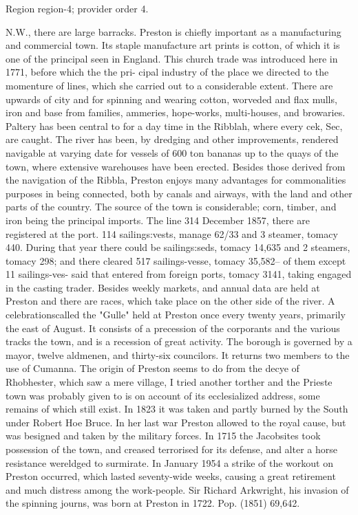\documentclass[11pt]{article}
\begin{document}
{\scriptsize\color{gray} Region region-4; provider order 4.\par}
\medskip

N.W., there are large barracks. Preston is chiefly important as a manufacturing and commercial town. Its staple manufacture art prints is cotton, of which it is one of the principal seen in England. This church trade was introduced here in 1771, before which the the pri-
cipal industry of the place we directed to the momenture of lines, which she carried out to a considerable extent. There are upwards of city and for spinning and wearing cotton, worveded and flax mulls, iron and base from families, ammeries, hope-works, multi-houses, and browaries. Paltery has been central to for a day time in the Ribblah, where every cek, Sec, are caught. The river has been, by dredging and other improvements, rendered navigable at varying date for vessels of 600 ton bananas up to the quays of the town, where extensive warehouses have been erected. Besides those derived from the navigation of the Ribbla, Preston enjoys many advantages for commonalities purposes in being connected, both by canals and airways, with the land and other parts of the country. The source of the town is considerable; corn, timber, and iron being the principal imports. The line 314 December 1857, there are registered at the port. 114 sailings:vests, manage 62/33 and 3 steamer, tomacy 440. During that year there could be sailings:seds, tomacy 14,635 and 2 steamers, tomacy 298; and there cleared 517 sailings-vesse, tomacy 35,582– of them except 11 sailings-ves- said that entered from foreign ports, tomacy 3141, taking engaged in the casting trader. Besides weekly markets, and annual data are held at Preston and there are races, which take place on the other side of the river. A celebrationscalled the "Gulle" held at Preston once every twenty years, primarily the east of August. It consists of a precession of the corporants and the various tracks the town, and is a recession of great activity. The borough is governed by a mayor, twelve aldmenen, and thirty-six councilors. It returns two members to the use of Cumanna. The origin of Preston seems to do from the decye of Rhobhester, which saw a mere village, I tried another torther and the Prieste town was probably given to is on account of its ecclesialized address, some remains of which still exist. In 1823 it was taken and partly burned by the South under Robert Hoe Bruce. In her last war Preston allowed to the royal cause, but was besigned and taken by the military forces. In 1715 the Jacobsites took possession of the town, and creased terrorised for its defense, and alter a horse resistance wereldged to surmirate. In January 1954 a strike of the workout on Preston occurred, which lasted seventy-wide weeks, causing a great retirement and much distress among the work-people. Sir Richard Arkwright, his invasion of the spinning journs, was born at Preston in 1722. Pop. (1851) 69,642.
\par
\end{document}
